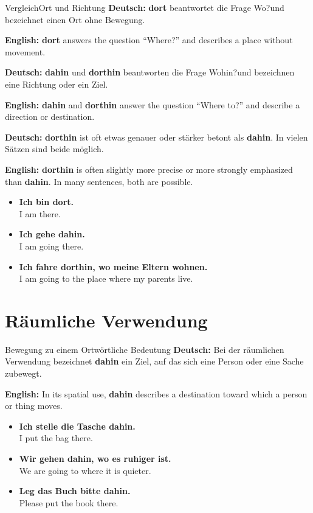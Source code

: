\documentclass[a4paper,11pt]{article}
\newcommand{\GermanText}[1]{\textbf{Deutsch: }#1\par}
\newcommand{\EnglishText}[1]{{\small\color{SoftGray}\textbf{English: }#1\par}}
\newcommand{\ExampleItem}[2]{\item \textbf{#1}\\{\small\color{SoftGray}#2}}
\begin{document}
        \begin{grammarentry}{Vergleich}{Ort und Richtung}
            \GermanText{\textbf{dort} beantwortet die Frage \glqq Wo?\grqq und bezeichnet einen Ort ohne Bewegung.}
            \EnglishText{\textbf{dort} answers the question ``Where?'' and describes a place without movement.}
            
            \GermanText{\textbf{dahin} und \textbf{dorthin} beantworten die Frage \glqq Wohin?\grqq und bezeichnen eine Richtung oder ein Ziel.}
            \EnglishText{\textbf{dahin} and \textbf{dorthin} answer the question ``Where to?'' and describe a direction or destination.}
            
            \GermanText{\textbf{dorthin} ist oft etwas genauer oder stärker betont als \textbf{dahin}. In vielen Sätzen sind beide möglich.}
            \EnglishText{\textbf{dorthin} is often slightly more precise or more strongly emphasized than \textbf{dahin}. In many sentences, both are possible.}
        \end{grammarentry}
        
        \begin{exbox}
            \begin{itemize}
                \ExampleItem{Ich bin dort.}{I am there.}
                \ExampleItem{Ich gehe dahin.}{I am going there.}
                \ExampleItem{Ich fahre dorthin, wo meine Eltern wohnen.}{I am going to the place where my parents live.}
            \end{itemize}
        \end{exbox}
    
    
    \section{Räumliche Verwendung}
        
        \begin{grammarentry}{Bewegung zu einem Ort}{wörtliche Bedeutung}
            \GermanText{Bei der räumlichen Verwendung bezeichnet \textbf{dahin} ein Ziel, auf das sich eine Person oder eine Sache zubewegt.}
            \EnglishText{In its spatial use, \textbf{dahin} describes a destination toward which a person or thing moves.}
        \end{grammarentry}
        
        \begin{exbox}
            \begin{itemize}
                \ExampleItem{Ich stelle die Tasche dahin.}{I put the bag there.}
                \ExampleItem{Wir gehen dahin, wo es ruhiger ist.}{We are going to where it is quieter.}
                \ExampleItem{Leg das Buch bitte dahin.}{Please put the book there.}
            \end{itemize}
        \end{exbox}
    
\end{document}
